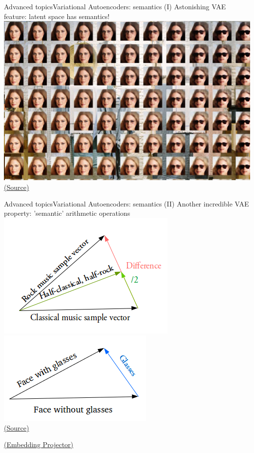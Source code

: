 \documentclass[10pt,compress]{beamer} %
\begin{document}
\begin{frame}{Advanced topics}{Variational Autoencoders: semantics (I)}
	Astonishing VAE feature: latent space has semantics!
	\centering\includegraphics[width=0.7\linewidth]{figs/faces.jpg}\\
	\scriptsize\href{https://www.compthree.com/blog/autoencoder/}{(Source)}
\end{frame}

\begin{frame}{Advanced topics}{Variational Autoencoders: semantics (II)}
	Another incredible VAE property: 'semantic' arithmetic operations
	\centering\includegraphics[width=0.3\linewidth]{figs/vector-vae1.png}\quad
	\centering\includegraphics[width=0.3\linewidth]{figs/vector-vae2.png}\\
	\scriptsize\href{https://towardsdatascience.com/intuitively-understanding-variational-autoencoders-1bfe67eb5daf}{(Source)}

	\bigskip
	\normalsize
	\href{https://projector.tensorflow.org/}{(Embedding Projector)}
\end{frame}
\end{document}
